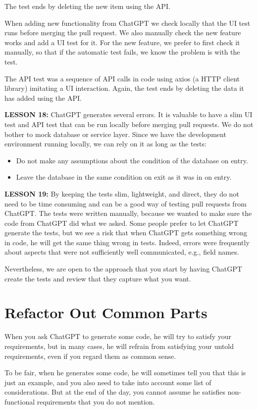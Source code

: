 \documentclass[runningheads]{llncs}
\begin{document}
The test ends by deleting the new item using the API.

When adding new functionality from ChatGPT we check locally that the UI test runs before merging the pull request. We also manually check the new feature works and add a UI test for it. For the new feature, we prefer to first check it manually, so that if the automatic test fails, we know the problem is with the test.

The API test was a sequence of API calls in code using axios (a HTTP client library) imitating a UI interaction. Again, the test ends by deleting the data it has added using the API.

\textbf{LESSON 18:} ChatGPT generates several errors. It is valuable to have a slim UI test and API test that can be run locally before merging pull requests.
We do not bother to mock database or service layer. Since we have the development environment running locally, we can rely on it as long as the tests:
\begin{itemize}
    \item Do not make any assumptions about the condition of the database on entry.
    \item Leave the database in the same condition on exit as it was in on entry.
\end{itemize}

\textbf{LESSON 19:} By keeping the tests slim, lightweight, and direct, they do not need to be time consuming and can be a good way of testing pull requests from ChatGPT.
The tests were written manually, because we wanted to make sure the code from ChatGPT did what we asked. Some people prefer to let ChatGPT generate the tests, but we see a risk that when ChatGPT gets something wrong in code, he will get the same thing wrong in tests. Indeed, errors were frequently about aspects that were not sufficiently well communicated, e.g., field names.

Nevertheless, we are open to the approach that you start by having ChatGPT create the tests and review that they capture what you want.

\section{Refactor Out Common Parts}
When you ask ChatGPT to generate some code, he will try to satisfy your requirements, but in many cases, he will refrain from satisfying your untold requirements, even if you regard them as common sense.

To be fair, when he generates some code, he will sometimes tell you that this is just an example, and you also need to take into account some list of considerations. But at the end of the day, you cannot assume he satisfies non-functional requirements that you do not mention.
\end{document}
